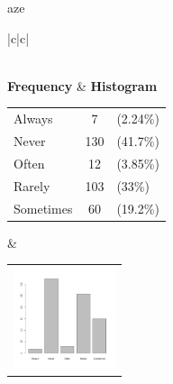  aze 
  \begin{center}
    \addtolength{\leftskip}{-4cm}\addtolength{\rightskip}{-4cm}
    \begin{tabular}{|c|c|}

      \hline
        \\
      \hline
        {\bf Frequency} & {\bf Histogram}  \\
          \begin{tabular}{@{}l@{ : }cl@{}}
            Always & 7 &(2.24\%) \\
            Never & 130 &(41.7\%) \\
            Often & 12 &(3.85\%) \\
            Rarely & 103 &(33\%) \\
            Sometimes & 60 &(19.2\%) \\
          \end{tabular}
      &
          \begin{tabular}{@{}l@{}}
            \includegraphics[width=3cm]{graphUniv/V10-barplot}
          \end{tabular}
      \\ \hline 

    \end{tabular}
  \end{center}
  
  



